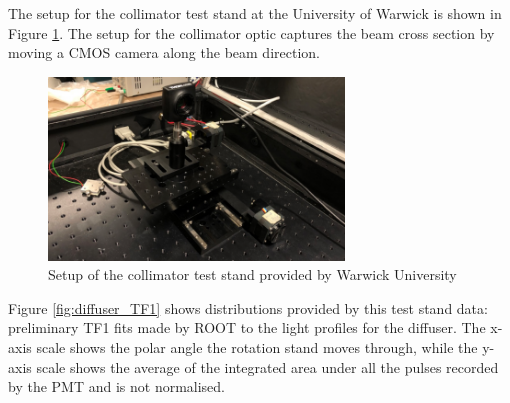 The setup for the collimator test stand at the University of Warwick is shown in Figure \ref{fig:coll_test_stand}.  The setup for the collimator optic captures the beam cross section by moving a CMOS camera along the beam direction. 

\begin{figure}
    \centering
    \includegraphics[width=0.7\textwidth]{Figures/coll_test_stand.png}
    \caption{Setup of the collimator test stand provided by Warwick University}
    \label{fig:coll_test_stand}
\end{figure}

Figure \ref{fig:diffuser_TF1} shows distributions provided by this test stand data: preliminary TF1 fits made by ROOT to the light profiles for the diffuser.  The x-axis scale shows the polar angle the rotation stand moves through, while the y-axis scale shows the average of the integrated area under all the pulses recorded by the PMT and is not normalised. 

